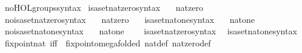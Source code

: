 \begin{isabellebody}
\isanewline
{}\isamarkupfalse%
\ no{\isacharunderscore}{\kern0pt}HOL{\isacharunderscore}{\kern0pt}groups{\isacharunderscore}{\kern0pt}syntax\isanewline
\isanewline
{}\isamarkupfalse%
\ isa{\isacharunderscore}{\kern0pt}set{\isacharunderscore}{\kern0pt}nat{\isacharunderscore}{\kern0pt}zero{\isacharunderscore}{\kern0pt}syntax\ \ \isamarkupfalse%
\ nat{\isacharunderscore}{\kern0pt}zero\ {\isacharparenleft}{\kern0pt}{\isachardoublequoteopen}{}{\isachardoublequoteclose}{\isacharparenright}{\kern0pt}\ \isamarkupfalse%
\isanewline
{}\isamarkupfalse%
\ no{\isacharunderscore}{\kern0pt}isa{\isacharunderscore}{\kern0pt}set{\isacharunderscore}{\kern0pt}nat{\isacharunderscore}{\kern0pt}zero{\isacharunderscore}{\kern0pt}syntax\ \ \isamarkupfalse%
\ nat{\isacharunderscore}{\kern0pt}zero\ {\isacharparenleft}{\kern0pt}{\isachardoublequoteopen}{}{\isachardoublequoteclose}{\isacharparenright}{\kern0pt}\ \isamarkupfalse%
\isanewline
\isanewline
{}\isamarkupfalse%
\ isa{\isacharunderscore}{\kern0pt}set{\isacharunderscore}{\kern0pt}nat{\isacharunderscore}{\kern0pt}one{\isacharunderscore}{\kern0pt}syntax\ \ \isamarkupfalse%
\ nat{\isacharunderscore}{\kern0pt}one\ {\isacharparenleft}{\kern0pt}{\isachardoublequoteopen}{}{\isachardoublequoteclose}{\isacharparenright}{\kern0pt}\ \isamarkupfalse%
\isanewline
{}\isamarkupfalse%
\ no{\isacharunderscore}{\kern0pt}isa{\isacharunderscore}{\kern0pt}set{\isacharunderscore}{\kern0pt}nat{\isacharunderscore}{\kern0pt}one{\isacharunderscore}{\kern0pt}syntax\ \ \isamarkupfalse%
\ nat{\isacharunderscore}{\kern0pt}one\ {\isacharparenleft}{\kern0pt}{\isachardoublequoteopen}{}{\isachardoublequoteclose}{\isacharparenright}{\kern0pt}\ \isamarkupfalse%
\isanewline
\isanewline
{}\isamarkupfalse%
\isanewline
\ \ isa{\isacharunderscore}{\kern0pt}set{\isacharunderscore}{\kern0pt}nat{\isacharunderscore}{\kern0pt}zero{\isacharunderscore}{\kern0pt}syntax\isanewline
\ \ isa{\isacharunderscore}{\kern0pt}set{\isacharunderscore}{\kern0pt}nat{\isacharunderscore}{\kern0pt}one{\isacharunderscore}{\kern0pt}syntax\isanewline
\isanewline
{}\isamarkupfalse%
\ fixpoint{\isacharunderscore}{\kern0pt}nat\ {\isacharbrackleft}{\kern0pt}iff{\isacharbrackright}{\kern0pt}\ {\isacharequal}{\kern0pt}\ fixpoint{\isacharunderscore}{\kern0pt}omega{\isacharbrackleft}{\kern0pt}folded\ nat{\isacharunderscore}{\kern0pt}def\ nat{\isacharunderscore}{\kern0pt}zero{\isacharunderscore}{\kern0pt}def{\isacharbrackright}{\kern0pt}\isanewline

\end{isabellebody}
